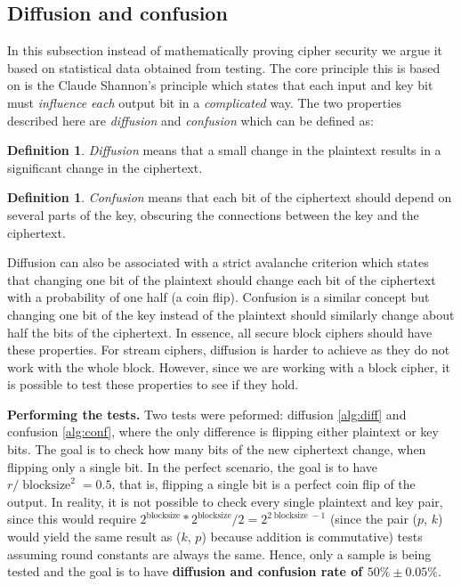 \documentclass{Resources/UoBLab1}
\theoremstyle{definition}
\newtheorem{definition}[theorem]{Definition}
\begin{document}
\subsection{Diffusion and confusion}
In this subsection instead of mathematically proving cipher security we argue it based on statistical data obtained from testing. The core principle this is based on is the Claude Shannon's principle which states that each input and key bit must \textit{influence each} output bit in a \textit{complicated} way\cite{OneTime}. The two properties described here are \textit{diffusion} and \textit{confusion} which can be defined as:
\begin{definition}
    \textit{Diffusion} means that a small change in the plaintext results in a significant change in the ciphertext.
\end{definition}
\begin{definition}
    \textit{Confusion} means that each bit of the ciphertext should depend on several parts of the key, obscuring the connections between the key and the ciphertext.
\end{definition}
Diffusion can also be associated with a strict avalanche criterion which states that changing one bit of the plaintext should change each bit of the ciphertext with a probability of one half (a coin flip). Confusion is a similar concept but changing one bit of the key instead of the plaintext should similarly change about half the bits of the ciphertext. In essence, all secure block ciphers should have these properties. For stream ciphers, diffusion is harder to achieve as they do not work with the whole block. However, since we are working with a block cipher, it is possible to test these properties to see if they hold.\medskip

\noindent\textbf{Performing the tests.} Two tests were peformed: diffusion \ref{alg:diff} and confusion \ref{alg:conf}, where the only difference is flipping either plaintext or key bits. The goal is to check how many bits of the new ciphertext change, when flipping only a single bit. In the perfect scenario, the goal is to have \(r / \operatorname{block size}^2 = 0.5\), that is, flipping a single bit is a perfect coin flip of the output. In reality, it is not possible to check every single plaintext and key pair, since this would require \(2^{\operatorname{block size}} * 2^{\operatorname{block size}} / 2 = 2^{2\operatorname{blocksize}-1}\) (since the pair ($p$, $k$) would yield the same result as ($k$, $p$) because addition is commutative) tests assuming round constants are always the same. Hence, only a sample is being tested and the goal is to have \textbf{diffusion and confusion rate of $ 50\% \pm 0.05\%$}.
\end{document}
